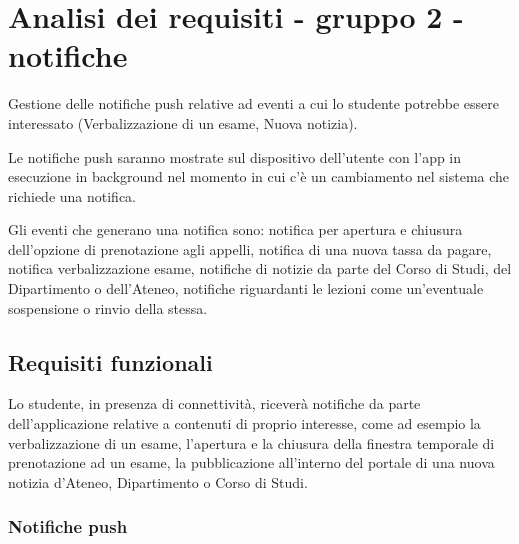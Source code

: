 
\chapter{Analisi dei requisiti - gruppo 2 - notifiche}
\label{ref:requisiti2-notifiche}

Gestione delle notifiche push relative ad eventi a cui lo studente potrebbe essere interessato (Verbalizzazione di un esame, Nuova notizia). 

Le notifiche push saranno mostrate sul dispositivo dell’utente con l’app in esecuzione in background nel momento in cui c’è un cambiamento nel sistema che richiede una notifica.  

Gli eventi che generano una notifica sono: notifica per apertura e chiusura dell'opzione di prenotazione agli appelli, notifica di una nuova tassa da pagare, notifica verbalizzazione esame, notifiche di notizie da parte del Corso di Studi, del Dipartimento o dell’Ateneo, notifiche riguardanti le lezioni come un’eventuale sospensione o rinvio della stessa.

\section{Requisiti funzionali}

Lo studente, in presenza di connettività, riceverà notifiche da parte dell’applicazione relative a contenuti di proprio interesse, come ad esempio la verbalizzazione di un esame, l’apertura e la chiusura della finestra temporale di prenotazione ad un esame, la pubblicazione all’interno del portale di una nuova notizia d’Ateneo, Dipartimento o Corso di Studi.

\subsection{Notifiche push} 

